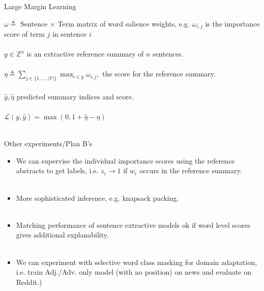 \begin{frame}{Large Margin Learning}

    $\omega \triangleq $ Sentence $\times$ Term matrix of word salience 
    weights, e.g. $\omega_{i,j}$ is the importance score of term $j$ 
    in sentence $i$ \\

    ~\\
    $y \in \mathbb{Z}^n$ is an extractive reference summary of $n$ sentences.
    ~\\
    ~\\
    $\eta \triangleq \sum_{j \in \{1, \ldots, |\mathcal{V}|\}} 
        \max_{i \in y} \omega_{i,j},$ the score for the reference summary.
    ~\\
    ~\\
    $\hat{y}, \hat{\eta}$ predicted summary indices and score.
    ~\\
    ~\\
    $\mathcal{L}(y, \hat{y}) = \max\left(0, 1 + \hat{\eta} - \eta \right) $ 
    ~\\
    ~\\

\end{frame}

\begin{frame}{Other experiments/Plan B's}

    \begin{itemize}
        \item We can supervise the individual importance scores using
            the reference abstracts to get labels, i.e. $z_i \rightarrow 1$
            if $w_i$ occurs in the reference summary.
            ~\\~\\
        \item More sophisticated inference, e.g. knapsack packing.~\\~\\
        \item Matching performance of sentence extractive models ok if 
            word level scores gives additional explanability.
            ~\\~\\
        \item We can experiment with selective word class masking for 
            domain adaptation, i.e. train Adj./Adv. 
            only model (with no position)
            on news and evaluate on Reddit.)
    \end{itemize}
\end{frame}



